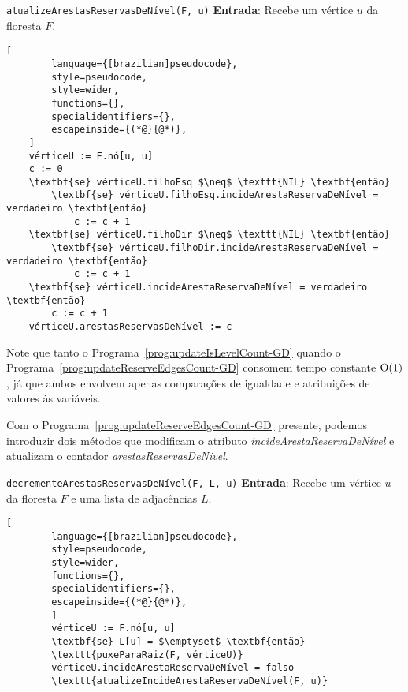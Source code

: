 \begin{programruledcaption}{\texttt{atualizeArestasReservasDeNível(F, u)} \label{prog:updateReserveEdgesCount-GD}}
    \noindent\textbf{Entrada}: Recebe um vértice $u$ da floresta $F$.
    \vspace{-0.5\baselineskip}
    \begin{lstlisting}[
        language={[brazilian]pseudocode},
        style=pseudocode,
        style=wider,
        functions={},
        specialidentifiers={},
        escapeinside={(*@}{@*)},
    ]
    vérticeU := F.nó[u, u]
    c := 0
    \textbf{se} vérticeU.filhoEsq $\neq$ \texttt{NIL} \textbf{então}
        \textbf{se} vérticeU.filhoEsq.incideArestaReservaDeNível = verdadeiro \textbf{então}
            c := c + 1
    \textbf{se} vérticeU.filhoDir $\neq$ \texttt{NIL} \textbf{então}
        \textbf{se} vérticeU.filhoDir.incideArestaReservaDeNível = verdadeiro \textbf{então}
            c := c + 1
    \textbf{se} vérticeU.incideArestaReservaDeNível = verdadeiro \textbf{então}
        c := c + 1
    vérticeU.arestasReservasDeNível := c
    \end{lstlisting}
    \vspace{-0.5\baselineskip}
\end{programruledcaption}
Note que tanto o Programa~\ref{prog:updateIsLevelCount-GD} quando o Programa~\ref{prog:updateReserveEdgesCount-GD} consomem tempo constante $\mathrm{O}(1)$, já que ambos envolvem apenas comparações de igualdade e atribuições de valores às variáveis.

Com o Programa~\ref{prog:updateReserveEdgesCount-GD} presente, podemos introduzir dois métodos que modificam o atributo \textit{incideArestaReservaDeNível} e atualizam o contador \textit{arestasReservasDeNível}.

\begin{programruledcaption}{\texttt{decrementeArestasReservasDeNível(F, L, u)} \label{prog:decrementReserveEdgesCount-GD}}
    \noindent\textbf{Entrada}: Recebe um vértice $u$ da floresta $F$ e uma lista de adjacências $L$.
    \vspace{-0.5\baselineskip}
    \begin{lstlisting}[
        language={[brazilian]pseudocode},
        style=pseudocode,
        style=wider,
        functions={},
        specialidentifiers={},
        escapeinside={(*@}{@*)},
        ]
        vérticeU := F.nó[u, u]
        \textbf{se} L[u] = $\emptyset$ \textbf{então} 
        \texttt{puxeParaRaiz(F, vérticeU)}
        vérticeU.incideArestaReservaDeNível = falso
        \texttt{atualizeIncideArestaReservaDeNível(F, u)}
    \end{lstlisting}
    \vspace{-0.5\baselineskip}
\end{programruledcaption}


